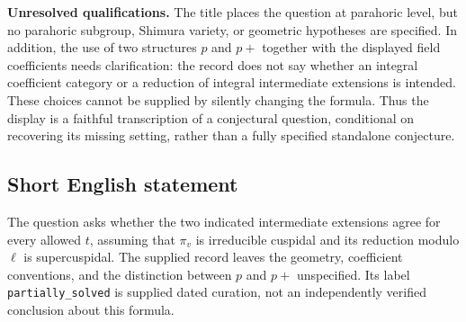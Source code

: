\documentclass[11pt]{article}
\begin{document}
\textbf{Unresolved qualifications.} The title places the question at parahoric level, but no parahoric subgroup, Shimura variety, or geometric hypotheses are specified. In addition, the use of two structures \(p\) and \(p+\) together with the displayed field coefficients needs clarification: the record does not say whether an integral coefficient category or a reduction of integral intermediate extensions is intended. These choices cannot be supplied by silently changing the formula. Thus the display is a faithful transcription of a conjectural question, conditional on recovering its missing setting, rather than a fully specified standalone conjecture.
\subsection{Short English statement}
The question asks whether the two indicated intermediate extensions agree for every allowed \(t\), assuming that \(\pi_v\) is irreducible cuspidal and its reduction modulo \(\ell\) is supercuspidal. The supplied record leaves the geometry, coefficient conventions, and the distinction between \(p\) and \(p+\) unspecified. Its label \texttt{partially\_solved} is supplied dated curation, not an independently verified conclusion about this formula.
\end{document}
